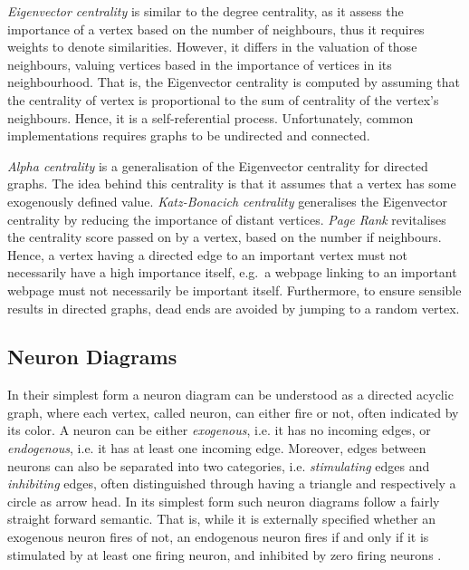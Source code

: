 \documentclass[11pt,a4paper]{book}
\theoremstyle{definition}
\theoremstyle{definition}
\theoremstyle{definition}
\theoremstyle{remark}
\begin{document}
\emph{Eigenvector centrality} is similar to the degree centrality, as it assess the importance of a vertex based on the number of neighbours, thus it requires weights to denote similarities. However, it differs in the valuation of those neighbours, valuing vertices based in the importance of vertices in its neighbourhood. That is, the Eigenvector centrality is computed by assuming that the centrality of vertex is proportional to the sum of centrality of the vertex's neighbours. Hence, it is a self-referential process. Unfortunately, common implementations requires graphs to be undirected and connected.


 \emph{Alpha centrality} is a generalisation of the Eigenvector centrality for directed graphs. The idea behind this centrality is that it assumes that a vertex has some exogenously defined value. \emph{Katz-Bonacich centrality} generalises the Eigenvector centrality by reducing the importance of distant vertices. 
\emph{Page Rank} revitalises the centrality score passed on by a vertex, based on the number if neighbours. Hence, a vertex having a directed edge to an important vertex must not necessarily have a high importance itself, e.g.\ a webpage linking to an important webpage must not necessarily be important itself. Furthermore, to ensure sensible results in directed graphs, dead ends are avoided by jumping to a random vertex.




\subsection{Neuron Diagrams}
\label{subsec:neuron_diagrams}
In their simplest form a neuron diagram can be understood as a directed acyclic graph, where each vertex, called neuron, can either fire or not, often indicated by its color. A neuron can be either \emph{exogenous}, i.e. it has no incoming edges, or \emph{endogenous}, i.e. it has at least one incoming edge. Moreover, edges between neurons can also be separated into two categories, i.e. \emph{stimulating} edges and \emph{inhibiting} edges, often distinguished through having a triangle and respectively a circle as arrow head. 
In its simplest form such neuron diagrams follow a fairly straight forward semantic. That is, while it is externally specified whether an exogenous neuron fires of not, an endogenous neuron fires if and only if it is stimulated by at least one firing neuron, and inhibited by zero firing neurons \cite{hitchcock2009structural,erwig2010causal,baumgartner2013regularity}. 
\end{document}
